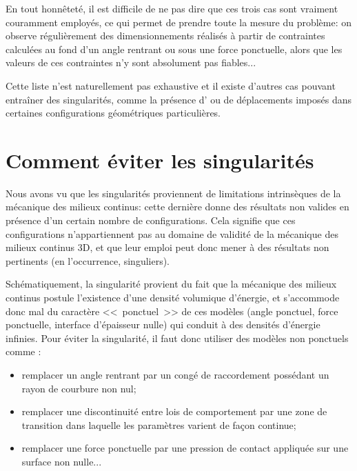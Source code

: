 \medskip
En tout honnêteté, il est difficile de ne pas dire que ces trois cas sont vraiment couramment
employés, ce qui permet de prendre toute la mesure du problème: on observe régulièrement des
dimensionnements réalisés à partir de contraintes calculées au fond d'un angle rentrant ou sous
une force ponctuelle, alors que les valeurs de ces contraintes n'y sont absolument pas fiables...

Cette liste n'est naturellement pas exhaustive et il existe d'autres cas pouvant entraîner des
singularités, comme la présence d' ou de déplacements imposés
dans certaines configurations géométriques particulières.


\medskip
\section{Comment éviter les singularités}

Nous avons vu que les singularités proviennent de limitations intrinsèques de la mécanique des
milieux continus: cette dernière donne des résultats non valides en présence d'un certain
nombre de configurations. Cela signifie que ces configurations n'appartiennent
pas au domaine de validité de la mécanique des milieux continus 3D, et que leur emploi peut
donc mener à des résultats non pertinents (en l'occurrence, singuliers).

\medskip
Schématiquement, la singularité provient du fait que la mécanique des milieux continus postule
l'existence d'une densité volumique d'énergie, et s'accommode donc mal du caractère
<<~ponctuel~>> de ces modèles (angle ponctuel, force ponctuelle, interface d'épaisseur nulle) qui
conduit à des densités d'énergie infinies. Pour éviter la singularité, il faut donc utiliser des
modèles non ponctuels comme :
\begin{itemize}
   \item remplacer un angle rentrant par un congé de raccordement possédant un rayon de courbure
	non nul;
   \item remplacer une discontinuité entre lois de comportement par une zone de transition dans
	laquelle les paramètres varient de façon continue;
   \item remplacer une force ponctuelle par une pression de contact appliquée sur une surface non
	nulle...
\end{itemize}

